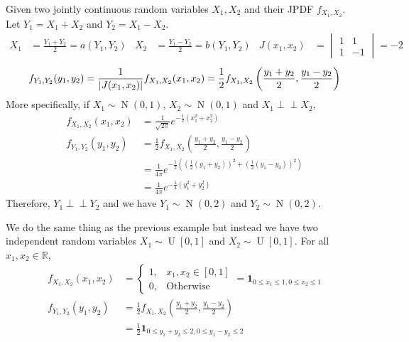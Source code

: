 \documentclass{huhtakm-template-book}
\newcommand{\independent}{\perp\!\!\!\perp}
\DeclareMathOperator{\U}{U}
\DeclareMathOperator{\N}{N}
\begin{document}
\newpage
\begin{eg}
	Given two jointly continuous random variables $X_{1},X_{2}$ and their JPDF $f_{X_{1},X_{2}}$.\\
	Let $Y_{1}=X_{1}+X_{2}$ and $Y_{2}=X_{1}-X_{2}$.
	\begin{align*}
		X_{1}&=\frac{Y_{1}+Y_{2}}{2}=a(Y_{1},Y_{2}) & X_{2}&=\frac{Y_{1}-Y_{2}}{2}=b(Y_{1},Y_{2}) & J(x_{1},x_{2})&=\begin{vmatrix}
			1 & 1\\
			1 & -1
		\end{vmatrix}=-2
	\end{align*}
	\begin{equation*}
		f_{Y_{1},Y_{2}}(y_{1},y_{2})=\frac{1}{\left|{J(x_{1},x_{2})}\right|}f_{X_{1},X_{2}}(x_{1},x_{2})=\frac{1}{2}f_{X_{1},X_{2}}\left(\frac{y_{1}+y_{2}}{2},\frac{y_{1}-y_{2}}{2}\right)
	\end{equation*}
	More specifically, if $X_{1}\sim\N(0,1)$, $X_{2}\sim\N(0,1)$ and $X_{1}\independent X_{2}$,
	\begin{align*}
		f_{X_{1},X_{2}}(x_{1},x_{2})&=\frac{1}{\sqrt{2\pi}}e^{-\frac{1}{2}(x_{1}^{2}+x_{2}^{2})}\\
		f_{Y_{1},Y_{2}}(y_{1},y_{2})&=\frac{1}{2}f_{X_{1},X_{2}}\left(\frac{y_{1}+y_{2}}{2},\frac{y_{1}-y_{2}}{2}\right)\\
		&=\frac{1}{4\pi}e^{-\frac{1}{2}\left(\left(\frac{1}{2}(y_{1}+y_{2})\right)^{2}+\left(\frac{1}{2}(y_{1}-y_{2})\right)^{2}\right)}\\
		&=\frac{1}{4\pi}e^{-\frac{1}{4}(y_{1}^{2}+y_{2}^{2})}
	\end{align*}
	Therefore, $Y_{1}\independent Y_{2}$ and we have $Y_{1}\sim\N(0,2)$ and $Y_{2}\sim\N(0,2)$.
\end{eg}
\begin{eg}
	We do the same thing as the previous example but instead we have two independent random variables $X_{1}\sim\U[0,1]$ and $X_{2}\sim\U[0,1]$. For all $x_{1},x_{2}\in\mathbb{R}$,
	\begin{align*}
		f_{X_{1},X_{2}}(x_{1},x_{2})&=\begin{cases}
			1, &x_{1},x_{2}\in[0,1]\\
			0, &\text{Otherwise}
		\end{cases}=\mathbf{1}_{0\leq x_{1}\leq 1,0\leq x_{2}\leq 1}\\
		f_{Y_{1},Y_{2}}(y_{1},y_{2})&=\frac{1}{2}f_{X_{1},X_{2}}\left(\frac{y_{1}+y_{2}}{2},\frac{y_{1}-y_{2}}{2}\right)\\
		&=\frac{1}{2}\mathbf{1}_{0\leq y_{1}+y_{2}\leq 2,0\leq y_{1}-y_{2}\leq 2}
	\end{align*}
\end{eg}
\end{document}
